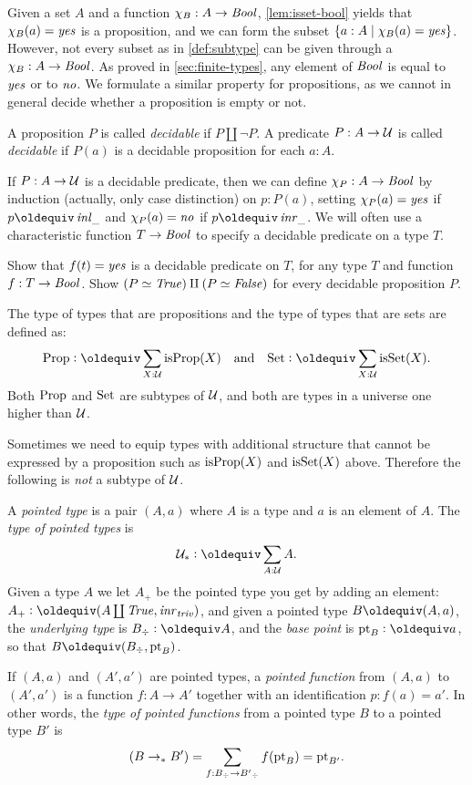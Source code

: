 Given a set $A$ and a function $\chi_B: A\to\mathop{\mathit{Bool}}$,
\cref{lem:isset-bool} yields that $\chi_B(a) = \mathop{\mathit{yes}}$ is a
proposition, and we can form
the subset $\{a:A \mid \chi_B(a) = \mathop{\mathit{yes}}\}$. However,
not every subset as in \cref{def:subtype} can be given
through a $\chi_B: A\to\mathop{\mathit{Bool}}$. As proved in \cref{sec:finite-types},
any element of $\mathop{\mathit{Bool}}$ is equal to $\mathop{\mathit{yes}}$ or to $\mathop{\mathit{no}}$.
We formulate a similar property for propositions,
as we cannot in general decide whether a proposition is empty or not.

\begin{definition}\label{def:decidability}
A proposition $P$ is called \emph{decidable} if $P\amalg\neg P$.
A predicate $P: A\to\mathcal{U}$ is called \emph{decidable} if 
$P(a)$ is a decidable proposition for each $a:A$.
\end{definition}

If $P: A\to\mathcal{U}$ is a decidable predicate, then
we can define $\chi_P: A\to\mathop{\mathit{Bool}}$ by induction (actually,
only case distinction) on $p:P(a)$, setting $\chi_P(a)=\mathop{\mathit{yes}}$
if $p\jdeq\inl{\_}$ and $\chi_P(a)=\mathop{\mathit{no}}$ if $p\jdeq\inr{\_}$.
We will often use a characteristic function $T\to\mathop{\mathit{Bool}}$ to
specify a decidable predicate on a type $T$.

\begin{xca}\label{xca:decidability}
Show that $f(t)=\mathop{\mathit{yes}}$ is a decidable predicate on $T$,
for any type $T$ and function $f:T\to\mathop{\mathit{Bool}}$.
Show $(P\simeq\mathop{\mathit{True}})\amalg(P\simeq\mathop{\mathit{False}})$ for every decidable
proposition $P$. 
\end{xca}

\begin{definition}\label{def:Prop-Set}
The type of types that are propositions and the 
type of types that are sets are defined as:
\[\Prop\defeq \sum_{X:\UU}\isprop(X)\quad
\text{and}\quad\Set\defeq \sum_{X:\UU}\isset(X).\]
Both $\mathord{\mathrm{Prop}}$ and $\mathord{\mathrm{Set}}$ are subtypes of $\mathcal{U}$, and
both are types in a universe one higher than $\mathcal{U}$. 
\end{definition}

Sometimes we need to equip types with additional structure
that cannot be expressed by a proposition such as
$\mathrm{isProp}(X)$ and $\mathrm{isSet}(X)$ above. 
Therefore the following is \emph{not} a subtype of $\mathcal{U}$.

\begin{definition}\label{def:pointedtypes}
 A \emph{pointed type} is a pair $(A,a)$ where $A$ is a type
 and $a$ is an element of $A$. The \emph{type of pointed types} is
\[\UUp \defeq \sum_{A:\UU} A.\]
Given a type $A$ we let $A_+$ be the pointed type you get 
by adding an element: $A_+\defequi(A\coprod\true,\inr{\triv})$, 
and given a pointed type $B\jdeq(A,a)$, the \emph{underlying type} 
is $B_\div\defeq A$, and the \emph{base point} is $\pt_B\defeq a$, 
so that $B\jdeq (B_\div,\pt_B)$.  

If $(A,a)$ and $(A',a')$ are pointed types, 
a \emph{pointed function} from  $(A,a)$ to $(A',a')$ is 
a function $f:A\to A'$ together with an identification $p:f(a)=a'$. 
In other words, the \emph{type of pointed functions} from a pointed 
type $B$ to a pointed type $B'$ is
\[(B\to_*B')=\sum_{f:B_\div\to B'{}_\div}f({\mathord{\mathrm{pt}}}_B)={\mathord{\mathrm{pt}}}_{B'}.\]
\end{definition}

